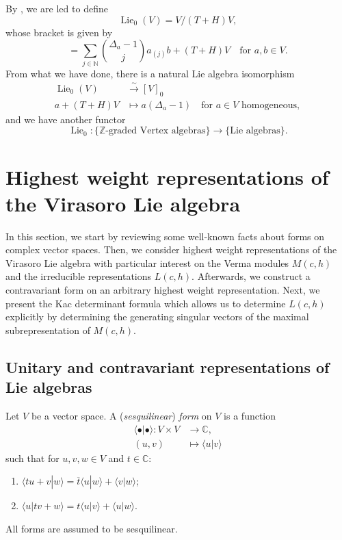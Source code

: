 \documentclass[a4paper, 12pt, reqno]{amsart}
\theoremstyle{remark}
\numberwithin{equation}{subsection}
\DeclareMathOperator{\Lie}{Lie}
\begin{document}
By , we are led to define
\begin{equation*}
  \Lie_0(V) = V/(T + H)V,
\end{equation*}
whose bracket is given by
\begin{equation*}
  [a + (T + H)V, b + (T + H)V] = \sum_{j \in \mathbb{N}}\binom{\Delta_a - 1}{j}a_{(j)}b + (T + H)V \quad \text{for }a, b \in V.
\end{equation*}
From what we have done, there is a natural Lie algebra isomorphism
\begin{align*}
  \Lie_0(V) &\xrightarrow{\sim} [V]_0 \\
  a + (T + H)V &\mapsto a(\Delta_a - 1) \quad \text{for }a \in V\text{ homogeneous},
\end{align*}
and we have another functor
\begin{equation*}
  \Lie_0: \{\text{$\mathbb{Z}$-graded Vertex algebras}\} \to \{\text{Lie algebras}\}.
\end{equation*}

\section{Highest weight representations of the Virasoro Lie algebra}
\label{sec:high-weight-repr}

In this section, we start by reviewing some well-known facts about forms on complex vector spaces.
Then, we consider highest weight representations of the Virasoro Lie algebra with particular interest on the Verma modules $M(c, h)$ and the irreducible representations $L(c, h)$.
Afterwards, we construct a contravariant form on an arbitrary highest weight representation.
Next, we present the Kac determinant formula which allows us to determine $L(c, h)$ explicitly by determining the generating singular vectors of the maximal subrepresentation of $M(c, h)$.

\subsection{Unitary and contravariant representations of Lie algebras}
\label{sec:unit-contr-repr}

Let $V$ be a vector space.
A (\emph{sesquilinear}) \emph{form} on $V$ is a function
\begin{align*}
  \langle \bullet| \bullet\rangle: V \times V &\to \mathbb{C}, \\
  (u, v) &\mapsto \langle u| v\rangle
\end{align*}
such that for $u, v, w \in V$ and $t \in \mathbb{C}$:
\begin{enumerate}
\item $\langle tu + v| w\rangle = \overline{t}\langle u| w\rangle + \langle v| w\rangle$;
\item $\langle u| tv + w\rangle = t\langle u| v\rangle + \langle u| w\rangle$.
\end{enumerate}
All forms are assumed to be sesquilinear.
\end{document}
